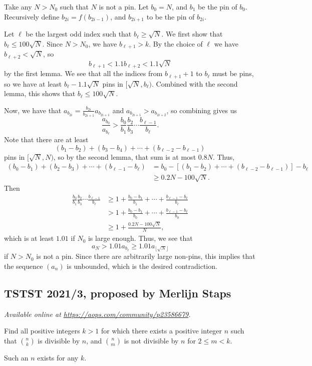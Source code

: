 \documentclass[11pt]{scrartcl}
\begin{document}
Take any $N>N_0$ such that $N$ is not a pin. Let $b_0=N$, and $b_1$ be the pin
of $b_0$. Recursively define $b_{2i}=f(b_{2i-1})$, and $b_{2i+1}$ to be the pin of $b_{2i}$.

Let $\ell$ be the largest odd index such that $b_\ell\ge\sqrt{N}$. We first show
that $b_\ell\le 100\sqrt{N}$. Since $N > N_0$, we have $b_{\ell+1} > k$. By the
choice of $\ell$ we have $b_{\ell+2}<\sqrt{N}$, so \[b_{\ell+1}<1.1b_{\ell+2}<
1.1\sqrt{N}\] by the first lemma. We see
that all the indices from $b_{\ell+1}+1$ to $b_\ell$ must be pins, so we have
at least $b_\ell-1.1\sqrt{N}$ pins in $[\sqrt{N},b_\ell)$. Combined with the
second lemma, this shows that $b_\ell\le 100\sqrt{N}$.

Now, we have that $a_{b_{2i}}=\tfrac{b_{2i}}{b_{2i+1}}a_{b_{2i+1}}$ and
$a_{b_{2i+1}}> a_{b_{2i+2}}$, so combining gives us
\[\frac{a_{b_0}}{a_{b_\ell}}> \frac{b_0}{b_1}\frac{b_2}{b_3}\dotsm\frac{b_{\ell-1}}{b_\ell}.\]
Note that there are at least
\[(b_1-b_2)+(b_3-b_4)+\dotsb+(b_{\ell-2}-b_{\ell-1})\]
pins in $[\sqrt{N},N)$, so by the second lemma, that sum is at most $0.8N$. Thus,
\begin{align*}
  (b_0-b_1)+(b_2-b_3)+\dotsb+(b_{\ell-1}-b_\ell)
  &=b_0-[(b_1-b_2)+\dotsb + (b_{\ell-2}-b_{\ell-1})]-b_\ell
  \\ &\ge 0.2N-100\sqrt{N}.
\end{align*}
Then
\begin{align*}
\frac{b_0}{b_1}\frac{b_2}{b_3}\dotsm
\frac{b_{\ell-1}}{b_\ell} &\ge 1+\frac{b_0-b_1}{b_1}+\dotsb+\frac{b_{\ell-1}-b_\ell}{b_\ell} \\
&> 1 +\frac{b_0-b_1}{b_0} + \dotsb +
\frac{b_{\ell-1}-b_{\ell}}{b_0} \\
&\ge 1+\frac{0.2N-100\sqrt{N}}{N},
\end{align*}
which is at least $1.01$ if $N_0$ is large enough. Thus, we see that
\[a_N>1.01 a_{b_{\ell}} \geq 1.01 a_{\lfloor\sqrt{N}\rfloor}\]
if $N>N_0$ is not a pin. Since there are arbitrarily large non-pins, this implies that the sequence $(a_n)$ is unbounded, which is the desired contradiction.
\pagebreak

\subsection{TSTST 2021/3, proposed by Merlijn Staps}
\textsl{Available online at \url{https://aops.com/community/p23586679}.}
\begin{mdframed}[style=mdpurplebox,frametitle={Problem statement}]
Find all positive integers $k > 1$ for which there exists a positive integer
$n$ such that $\binom{n}{k}$ is divisible by $n$, and $\binom{n}{m}$ is not
divisible by $n$ for $2\leq m < k$.
\end{mdframed}
Such an $n$ exists for any $k$.
\end{document}
